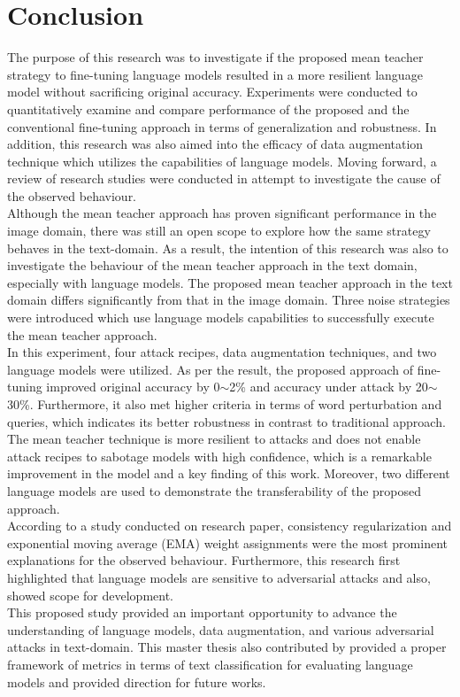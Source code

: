 \documentclass[%
	BCOR=8mm, %
	DIV=12,
	toc=bibliography, %
	toc=listof, %
	oneside, %
	egregdoesnotlikesansseriftitles, %
	]{scrbook}
\begin{document}
\section{Conclusion}
\label{section:conclusion}
The purpose of this research was to investigate if the proposed mean teacher strategy to fine-tuning language models resulted in a more resilient language model without sacrificing original accuracy. Experiments were conducted to quantitatively examine and compare performance of the proposed and the conventional fine-tuning approach in terms of generalization and robustness. In addition, this research was also aimed into the efficacy of data augmentation technique which utilizes the capabilities of language models. Moving forward, a review of research studies were conducted in attempt to investigate the cause of the observed behaviour. \\
Although the mean teacher approach has proven significant performance in the image domain, there was still an open scope to explore how the same strategy behaves in the text-domain. As a result, the intention of this research was also to investigate the behaviour of the mean teacher approach in the text domain, especially with language models. The proposed mean teacher approach in the text domain differs significantly from that in the image domain. Three noise strategies were introduced which use language models capabilities to successfully execute the mean teacher approach.\\
In this experiment, four attack recipes, data augmentation techniques, and two language models were utilized. As per the result, the proposed approach of fine-tuning improved original accuracy by 0$\sim$2\% and accuracy under attack by 20$\sim$30\%. Furthermore, it also met higher criteria in terms of word perturbation and queries, which indicates its better robustness in contrast to traditional approach. The mean teacher technique is more resilient to attacks and does not enable attack recipes to sabotage models with high confidence, which is a remarkable improvement in the model and a key finding of this work. Moreover, two different language models are used to demonstrate the transferability of the proposed approach.\\
According to a study conducted on research paper, consistency regularization and exponential moving average (EMA) weight assignments were the most prominent explanations for the observed behaviour.
Furthermore, this research first highlighted that language models are sensitive to adversarial attacks and also, showed scope for development. \\
This proposed study provided an important opportunity to advance the understanding of language models, data augmentation, and various adversarial attacks in text-domain. This master thesis also contributed by provided a proper framework of metrics in terms of text classification for evaluating language models and provided direction for future works.
\end{document}
